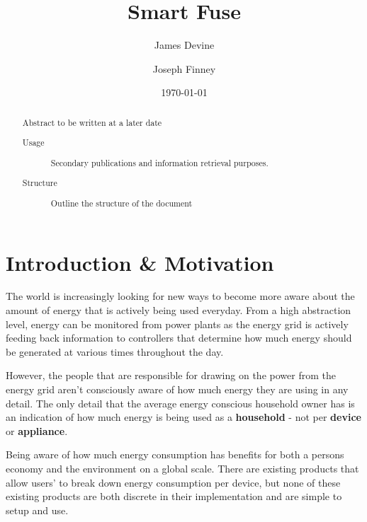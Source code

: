 \documentclass[draft,preprint,12pt,3p]{elsarticle}
\begin{document}
\title{Smart Fuse}%

\author{James Devine}
\address{School of Computing and Communications, Lancaster University}
\author{Joseph Finney}
\address{Infolab21, Lancaster University}

\date{\today}%

\begin{abstract}
Abstract to be written at a later date
\begin{description}
\item[Usage]
Secondary publications and information retrieval purposes.
\item[Structure]
Outline the structure of the document 
\end{description}
\end{abstract}

\maketitle

\tableofcontents

\section{Introduction \& Motivation}

The world is increasingly looking for new ways to become more aware about the amount of energy that is actively being used everyday. From a high abstraction level, energy can be monitored from power plants as the energy grid is actively feeding back information to controllers that determine how much energy should be generated at various times throughout the day.

However, the people that are responsible for drawing on the power from the energy grid aren't consciously aware of how much energy they are using in any detail. The only detail that the average energy conscious household owner has is an indication of how much energy is being used as a \textbf{household} - not per \textbf{device} or \textbf{appliance}.

Being aware of how much energy consumption has benefits for both a persons economy and the environment on a global scale. There are existing products that allow users' to break down energy consumption per device, but none of these existing products are both discrete in their implementation and are simple to setup and use. 
\end{document}
